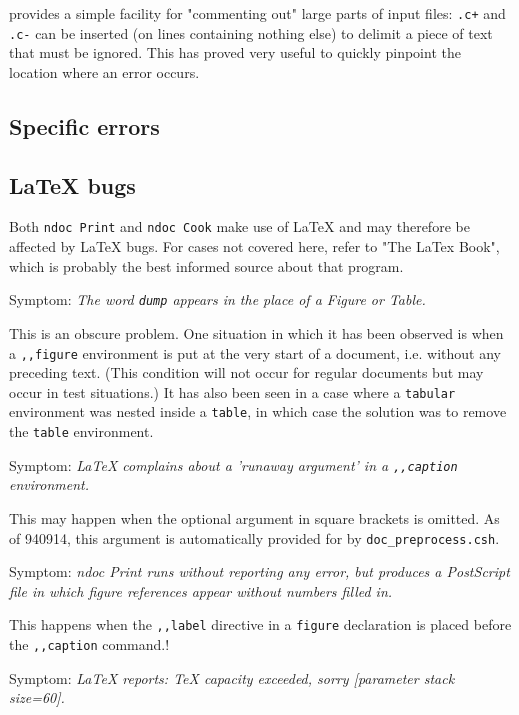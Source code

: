         \ndoc provides a simple facility for "commenting out" large parts of 
\tex input files: \verb/.c+/ and \verb/.c-/ can be inserted (on lines
containing nothing else) to delimit a piece of text that must be ignored. This
has proved very useful to quickly pinpoint the location where an error occurs. 


\subsection{ Specific errors} 

\subsection{ LaTeX bugs} 

        Both \verb/ndoc Print/ and \verb/ndoc Cook/ make use of LaTeX and may
therefore be affected by LaTeX bugs. For cases not covered here, refer to "The
LaTex Book", which is probably the best informed source about that program. 

\bi 
\item   Symptom: 
        {\em The word \verb/dump/ appears in the place of a Figure or Table.} 

        This is an obscure problem. One situation in which it has been observed
is when a \verb/,,figure/ environment is put at the very start of a document,
i.e. without any preceding text. (This condition will not occur for regular
documents but may occur in test situations.) It has also been seen in a case
where a \verb/tabular/ environment was nested inside a \verb/table/, in which
case the solution was to remove the \verb/table/ environment. 

\item   Symptom: 
        {\em LaTeX complains about a 'runaway argument' in a \verb/,,caption/
environment.} 

        This may happen when the optional argument in square brackets is
omitted. As of 940914, this argument is automatically provided for by 
\verb/doc_preprocess.csh/. 

\item   Symptom: 
        {\em ndoc Print runs without reporting any error, but produces a
PostScript file in which figure references appear without numbers filled in.} 

        This happens when the \verb/,,label/ directive in a \verb/figure/
declaration is placed before the \verb/,,caption/ command.! 

\item   Symptom: 
        {\em LaTeX reports: TeX capacity exceeded, sorry [parameter stack
size=60].} 

